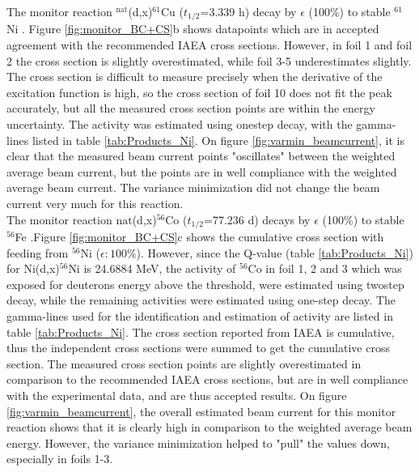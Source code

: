 \noindent 
The monitor reaction $^\text{nat}$(d,x)$^{61}$Cu ($t_{1/2}$=3.339 h) decay by $\epsilon$ (100\%) to stable $^{61}$Ni \cite{Zuber2015}. Figure \ref{fig:monitor_BC+CS}b shows datapoints which are in accepted agreement with the recommended IAEA cross sections. However, in foil 1 and foil 2 the cross section is slightly overestimated, while foil 3-5 underestimates slightly. The cross section is difficult to measure precisely when the derivative of the excitation function is high, so the cross section of foil 10 does not fit the peak accurately, but all the measured cross section points are within the energy uncertainty. The activity was estimated using onestep decay, with the gamma-lines listed in table \ref{tab:Products_Ni}. On figure \ref{fig:varmin_beamcurrent}, it is clear that the measured beam current points "oscillates" between the weighted average beam current, but the points are in well compliance with the weighted average beam current. The variance minimization did not change the beam current very much for this reaction. \\

\noindent 
The monitor reaction $\text{nat}$(d,x)$^{56}$Co ($t_{1/2}$=77.236 d) decays by $\epsilon$ (100\%) to stable $^{56}$Fe \cite{Junde2011}.Figure \ref{fig:monitor_BC+CS}c shows the cumulative cross section with feeding from $^{56}$Ni ($\epsilon:100\%$). However, since the Q-value (table \ref{tab:Products_Ni}) for Ni(d,x)$^{56}$Ni is 24.6884 MeV, the activity of $^{56}$Co in foil 1, 2 and 3 which was exposed for deuterons energy above the threshold, were estimated using twostep decay, while the remaining activities were estimated using one-step decay. The gamma-lines used for the identification and estimation of activity are listed in table \ref{tab:Products_Ni}. The cross section reported from IAEA is cumulative, thus the independent cross sections were summed to get the cumulative cross section. The measured cross section points are slightly overestimated in comparison to the recommended IAEA cross sections, but are in well compliance with the experimental data, and are thus accepted results. On figure \ref{fig:varmin_beamcurrent}, the overall estimated beam current for this monitor reaction shows that it is clearly high in comparison to the weighted average beam energy. However, the variance minimization helped to "pull" the values down, especially in foils 1-3. \\

